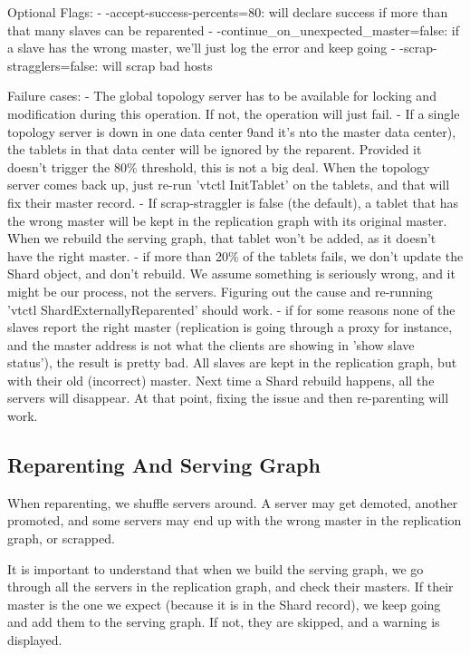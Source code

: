 Optional Flags:
- -accept-success-percents=80: will declare success if more than that many slaves can be reparented
- -continue\_on\_unexpected\_master=false: if a slave has the wrong master, we'll just log the error and keep going
- -scrap-stragglers=false: will scrap bad hosts

Failure cases:
- The global topology server has to be available for locking and modification during this operation. If not, the operation will just fail.
- If a single topology server is down in one data center 9and it's nto the master data center), the tablets in that data center will be ignored by the reparent. Provided it doesn't trigger the 80\% threshold, this is not a big deal. When the topology server comes back up, just re-run 'vtctl InitTablet' on the tablets, and that will fix their master record.
- If scrap-straggler is false (the default), a tablet that has the wrong master will be kept in the replication graph with its original master. When we rebuild the serving graph, that tablet won't be added, as it doesn't have the right master.
- if more than 20\% of the tablets fails, we don't update the Shard object, and don't rebuild. We assume something is seriously wrong, and it might be our process, not the servers. Figuring out the cause and re-running 'vtctl ShardExternallyReparented' should work.
- if for some reasons none of the slaves report the right master (replication is going through a proxy for instance, and the master address is not what the clients are showing in 'show slave status'), the result is pretty bad. All slaves are kept in the replication graph, but with their old (incorrect) master. Next time a Shard rebuild happens, all the servers will disappear. At that point, fixing the issue and then re-parenting will work.

\subsection{Reparenting And Serving Graph}\hypertarget{reparenting-and-serving-graph}{}\label{reparenting-and-serving-graph}

When reparenting, we shuffle servers around. A server may get demoted, another promoted, and some servers may end up with the wrong master in the replication graph, or scrapped.

It is important to understand that when we build the serving graph, we go through all the servers in the replication graph, and check their masters. If their master is the one we expect (because it is in the Shard record), we keep going and add them to the serving graph. If not, they are skipped, and a warning is displayed.

